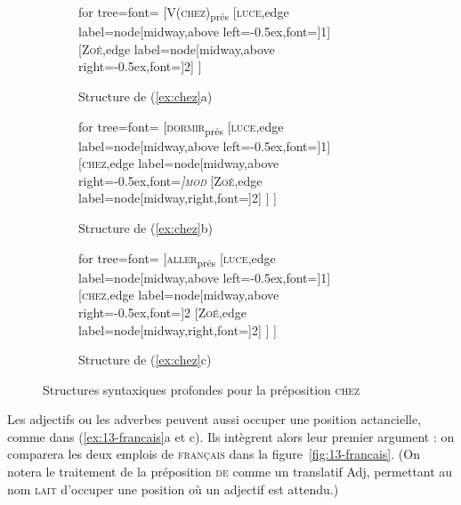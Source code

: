 \begin{figure}
	\begin{subfigure}[b]{0.3\textwidth}
		\centering
		\begin{forest} for tree={font=\normalfont}
			[V(\textsc{chez})\textsubscript{prés}
			[\textsc{luce},edge label={node[midway,above left=-0.5ex,font=\footnotesize]{1}}]
			[\textsc{Zoé},edge label={node[midway,above right=-0.5ex,font=\footnotesize]{2}}]
			]
		\end{forest}
		\caption{Structure de (\ref{ex:chez}a)}
	\end{subfigure}%
	\hfill
	\begin{subfigure}[b]{0.3\textwidth}
		\centering
		\begin{forest} for tree={font=\normalfont}
			[\textsc{dormir}\textsubscript{prés}
			[\textsc{luce},edge label={node[midway,above left=-0.5ex,font=\footnotesize]{1}}]
			[\textsc{chez},edge label={node[midway,above right=-0.5ex,font=\footnotesize\itshape]{\textsc{mod}}}
			[\textsc{Zoé},edge label={node[midway,right,font=\footnotesize]{2}}]
			]
			]
		\end{forest}
		\caption{Structure de (\ref{ex:chez}b)}
	\end{subfigure}%
	\hfill
	\begin{subfigure}[b]{0.3\textwidth}
		\centering
		\begin{forest} for tree={font=\normalfont}
			[\textsc{aller}\textsubscript{prés}
			[\textsc{luce},edge label={node[midway,above left=-0.5ex,font=\footnotesize]{1}}]
			[\textsc{chez},edge label={node[midway,above right=-0.5ex,font=\footnotesize]{2}}
			[\textsc{Zoé},edge label={node[midway,right,font=\footnotesize]{2}}]
			]
			]
		\end{forest}
		\caption{Structure de (\ref{ex:chez}c)}
	\end{subfigure}
\caption{Structures syntaxiques profondes pour la préposition \textsc{chez}\label{fig:chez}}
\end{figure}

Les adjectifs ou les adverbes peuvent aussi occuper une position actancielle, comme dans (\ref{ex:13-francais}a et c). Ils intègrent alors leur premier argument : on comparera les deux emplois de \textsc{français} dans la figure~\ref{fig:13-francais}. (On notera le traitement de la préposition \textsc{de} comme un translatif Adj, permettant au nom \textsc{lait} d'occuper une position où un adjectif est attendu.)

